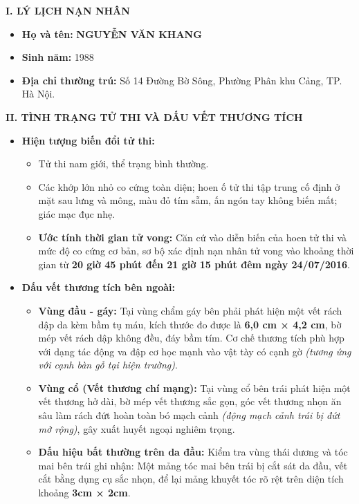 \documentclass[12pt,a4paper]{article}
\begin{document}
\vspace{0.3cm}\noindent\textbf{\large I. LÝ LỊCH NẠN NHÂN}\\[0.15cm]

\begin{itemize}[leftmargin=*, itemsep=2pt, topsep=2pt, parsep=0pt]
  \item \textbf{Họ và tên:} \textbf{NGUYỄN VĂN KHANG}
  \item \textbf{Sinh năm:} 1988
  \item \textbf{Địa chỉ thường trú:} Số 14 Đường Bờ Sông, Phường Phân khu Cảng, TP. Hà Nội.


\end{itemize}

\vspace{0.3cm}\noindent\textbf{\large II. TÌNH TRẠNG TỬ THI VÀ DẤU VẾT THƯƠNG TÍCH}\\[0.15cm]


\begin{itemize}[leftmargin=*, itemsep=2pt, topsep=2pt, parsep=0pt]
  \item \textbf{Hiện tượng biến đổi tử thi:}
\begin{itemize}[leftmargin=*, itemsep=2pt, topsep=2pt, parsep=0pt]
  \item Tử thi nam giới, thể trạng bình thường.
  \item Các khớp lớn nhỏ co cứng toàn diện; hoen ố tử thi tập trung cố định ở mặt sau lưng và mông, màu đỏ tím sẫm, ấn ngón tay không biến mất; giác mạc đục nhẹ.
  \item \textbf{Ước tính thời gian tử vong:} Căn cứ vào diễn biến của hoen tử thi và mức độ co cứng cơ bản, sơ bộ xác định nạn nhân tử vong vào khoảng thời gian từ \textbf{20 giờ 45 phút đến 21 giờ 15 phút đêm ngày 24/07/2016}.

\end{itemize}
  \item \textbf{Dấu vết thương tích bên ngoài:}
\begin{itemize}[leftmargin=*, itemsep=2pt, topsep=2pt, parsep=0pt]
  \item \textbf{Vùng đầu - gáy:} Tại vùng chẩm gáy bên phải phát hiện một vết rách dập da kèm bầm tụ máu, kích thước đo được là \textbf{6,0 cm × 4,2 cm}, bờ mép vết rách dập không đều, đáy bầm tím. Cơ chế thương tích phù hợp với dạng tác động va đập cơ học mạnh vào vật tày có cạnh gờ \textit{(tương ứng với cạnh bàn gỗ tại hiện trường)}.
  \item \textbf{Vùng cổ (Vết thương chí mạng):} Tại vùng cổ bên trái phát hiện một vết thương hở dài, bờ mép vết thương sắc gọn, góc vết thương nhọn ăn sâu làm rách đứt hoàn toàn bó mạch cảnh \textit{(động mạch cảnh trái bị đứt mở rộng)}, gây xuất huyết ngoại nghiêm trọng.
  \item \textbf{Dấu hiệu bất thường trên da đầu:} Kiểm tra vùng thái dương và tóc mai bên trái ghi nhận: Một mảng tóc mai bên trái bị cắt sát da đầu, vết cắt bằng dụng cụ sắc nhọn, để lại mảng khuyết tóc rõ rệt trên diện tích khoảng \textbf{3cm × 2cm}.


\end{itemize}
\end{itemize}
\end{document}
